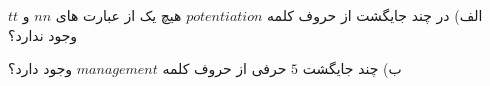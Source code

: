 \exercise
الف) در چند جایگشت از حروف کلمه
$potentiation$
هیچ یک از عبارت های
$nn$
و
$tt$
وجود ندارد؟

ب) چند جایگشت
$5$
حرفی از حروف کلمه
$management$
وجود دارد؟